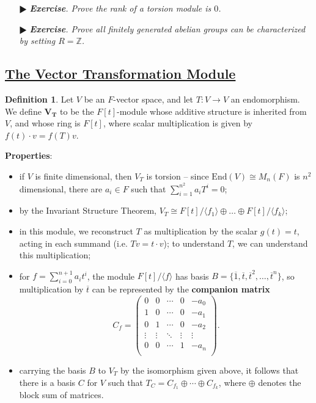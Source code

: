 \documentclass[11pt]{amsart}
\theoremstyle{definition}
\newtheorem*{definition*}{Definition}
\renewcommand\:{\colon}
\renewcommand\bar[1]{\overline{#1}}
\newcommand{\Z}{\mathds{Z}}
\newcommand{\1}{\mathds{1}}
\newcommand{\End}{\text{End}}
\newcommand{\exc}[1]{\vspace{-2.5pt}\begin{itemize}[leftmargin=15pt]\item[$\RHD$] \textit{\textbf{Exercise}. #1}\end{itemize}}
\begin{document}
\exc{Prove the rank of a torsion module is $0$.}
\exc{Prove all finitely generated abelian groups can be characterized by setting $R = \Z$.}
\vskip20pt

\subsection*{\underline{The Vector Transformation Module}}
\begin{definition*}
	Let $V$ be an $F$-vector space, and let $T\: V \to V$ an endomorphism. We define $\boldsymbol{V_T}$ to be the $F[t]$-module whose additive structure is inherited from $V$, and whose ring is $F[t]$, where scalar multiplication is given by $f(t) \cdot v = f(T)v$. 
\end{definition*}

\noindent \textbf{Properties}:
\begin{itemize}[leftmargin=*]\setlength\itemsep{0em}
	\item if $V$ is finite dimensional, then $V_T$ is torsion -- since $\End(V) \cong M_n(F)$ is $n^2$ dimensional, there are $a_i \in F$ such that $\sum_{i=1}^{n^2} a_iT^i = 0$;
	\item by the Invariant Structure Theorem, $V_T \cong F[t]/ \langle f_1 \rangle \oplus \dots \oplus F[t]/ \langle f_k \rangle$;
	\item in this module, we reconstruct $T$ as multiplication by the scalar $g(t) = t$, acting in each summand (i.e. $Tv = t \cdot v$); to understand $T$, we can understand this multiplication;
	\item for $f = \sum_{i=0}^{n+1} a_it^i$, the module $F[t]/ \langle f \rangle$ has basis $B = \{ \bar 1, \bar t, \bar t^2, \dots, \bar t^n\}$, so multiplication by $\bar t$ can be represented by the \textbf{companion matrix}
		\[ C_f = \begin{pmatrix} 
			0 & 0 & \cdots & 0 & -a_0 \\
			1 & 0 &\cdots & 0 & -a_1 \\
			0 & 1 & \cdots & 0 & -a_2 \\
			\vdots & \vdots & \ddots & \vdots & \vdots  \\
			0 & 0 & \cdots & 1 & -a_n \\
		\end{pmatrix}. \]
	\item carrying the basis $B$ to $V_T$ by the isomorphism given above, it follows that there is a basis $C$ for $V$ such that $T_C = C_{f_1} \oplus \cdots \oplus C_{f_k}$, where $\oplus$ denotes the block sum of matrices.
\end{itemize}
\end{document}
